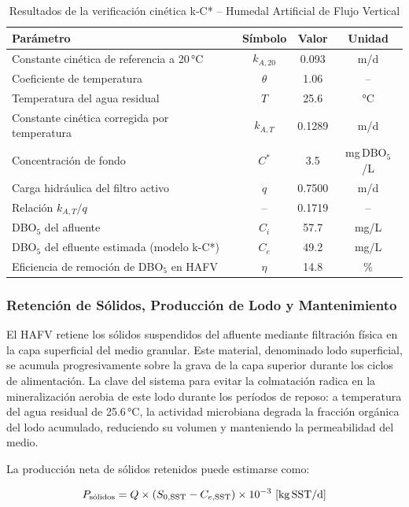 \documentclass[12pt,a4paper]{article}
\begin{document}
\begin{table}[H]
\centering
\caption{Resultados de la verificación cinética k-C* -- Humedal Artificial de Flujo Vertical}
\label{tab:verificacion_kC}
\begin{tabular}{lccc}
\toprule
\textbf{Parámetro} & \textbf{Símbolo} & \textbf{Valor} & \textbf{Unidad} \\
\midrule
Constante cinética de referencia a 20\,°C & $k_{A,20}$ & 0.093 & m/d \\
Coeficiente de temperatura & $\theta$ & 1.06 & -- \\
Temperatura del agua residual & $T$ & 25.6 & °C \\
Constante cinética corregida por temperatura & $k_{A,T}$ & 0.1289 & m/d \\
Concentración de fondo & $C^*$ & 3.5 & mg\,DBO$_5$/L \\
Carga hidráulica del filtro activo & $q$ & 0.7500 & m/d \\
Relación $k_{A,T} / q$ & -- & 0.1719 & -- \\
DBO$_5$ del afluente & $C_i$ & 57.7 & mg/L \\
DBO$_5$ del efluente estimada (modelo k-C*) & $C_e$ & 49.2 & mg/L \\
Eficiencia de remoción de DBO$_5$ en HAFV & $\eta$ & 14.8 & \% \\
\bottomrule
\end{tabular}
\end{table}


\subsubsection*{Retención de Sólidos, Producción de Lodo y Mantenimiento}

El HAFV retiene los sólidos suspendidos del afluente mediante filtración física en la capa superficial del medio granular. Este material, denominado lodo superficial, se acumula progresivamente sobre la grava de la capa superior durante los ciclos de alimentación. La clave del sistema para evitar la colmatación radica en la mineralización aerobia de este lodo durante los períodos de reposo: a temperatura del agua residual de 25.6\,°C, la actividad microbiana degrada la fracción orgánica del lodo acumulado, reduciendo su volumen y manteniendo la permeabilidad del medio.

La producción neta de sólidos retenidos puede estimarse como:

\begin{equation}
P_\text{sólidos} = Q \times (S_{0,\text{SST}} - C_{e,\text{SST}}) \times 10^{-3}\ \text{[kg\,SST/d]}
\end{equation}
\end{document}
